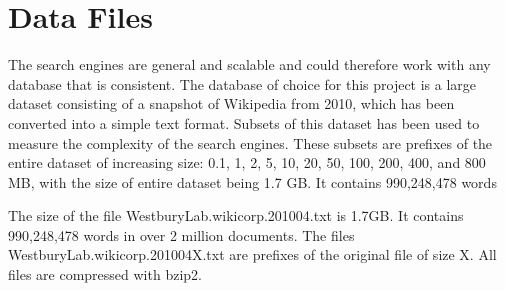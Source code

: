 \section{Data Files}

The search engines are general and scalable and could therefore work with any database that is consistent. The database of choice for this project is a large dataset consisting of a snapshot of Wikipedia from 2010, which has been converted into a simple text format. Subsets of this dataset has been used to measure the complexity of the search engines. These subsets are prefixes of the entire dataset of increasing size: 0.1, 1, 2, 5, 10, 20, 50, 100, 200, 400, and 800 MB, with the size of entire dataset being 1.7 GB. It contains 990,248,478 words


The size of the file WestburyLab.wikicorp.201004.txt is 1.7GB. It contains 990,248,478 words in over 2 million documents. The files WestburyLab.wikicorp.201004X.txt are prefixes of the original file of size X. All files are compressed with bzip2. 




